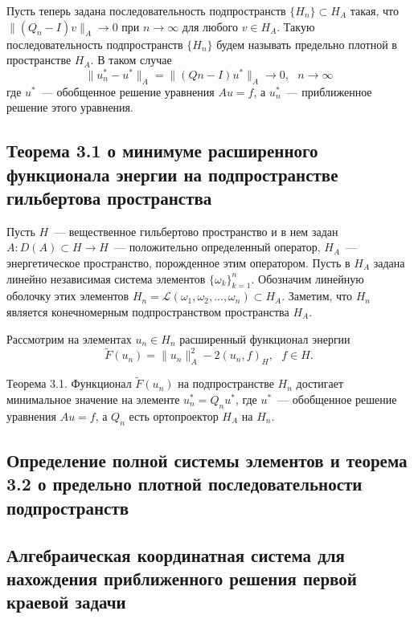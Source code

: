 \documentclass[a4paper,14pt]{article} %
\begin{document}
Пусть теперь задана последовательность подпространств
$\{H_n \} \subset H_A$ такая, что $\|(Q_n - I)v\|_A \to 0$ при
$n \to \infty$ для любого $v \in H_A$.
Такую последовательность подпространств $\{H_n \}$
будем называть предельно плотной в пространстве $H_A$.
В таком случае
\begin{equation}
	\|u^*_n - u^*\|_A = \|(Q n - I)u^* \|_A \to 0,
	~~~
	n\to\infty
\end{equation}
где $u^*$~--- обобщенное решение уравнения $Au = f$,
а $u^*_n$~--- приближенное решение этого уравнения.


\subsection{Теорема 3.1 о минимуме расширенного функционала энергии на подпространстве гильбертова пространства}

Пусть $H$~--- вещественное гильбертово пространство и в нем задан
$A : D(A) \subset H \to H$~--- положительно определенный оператор,
$H_A$~--- энергетическое пространство, порожденное этим оператором.
Пусть в $H_A$ задана линейно независимая система элементов $\{\omega_k\}_{k=1}^n$.
Обозначим линейную оболочку этих элементов $H_n = \mathcal{L}(\omega_1, \omega_2 , ... , \omega_n ) \subset H_A$.
Заметим, что $H_n$ является конечномерным подпространством пространства $H_A$.

Рассмотрим на элементах $u_n \in H_n$ расширенный функционал энергии
\begin{equation}
	\tilde{F}(u_n ) = \|u_n \|^2_A - 2(u_n, f )_H ,
	~~~
	f \in H.
\end{equation}

Теорема 3.1.
Функционал $\tilde{F}(u_n)$ на подпространстве $H_n$ достигает
минимальное значение на элементе $u^*_n = Q_n u^*$,
где $u^*$~--- обобщенное решение уравнения $Au = f$, а $Q_n$ есть ортопроектор $H_A$ на $H_n$.


\subsection{Определение полной системы элементов и теорема 3.2 о предельно плотной последовательности подпространств}

\subsection{Алгебраическая координатная система для нахождения приближенного решения первой краевой задачи}
\end{document}
